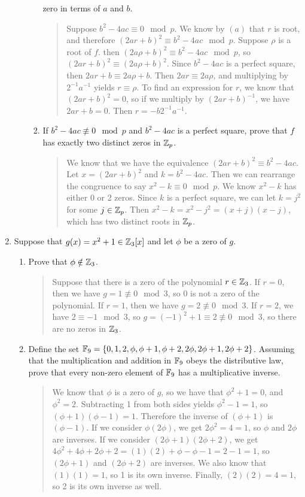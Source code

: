 \documentclass{hw}
\begin{document}
\begin{enumerate}
\begin{enumerate}
\begin{enumerate}
zero in terms of $a$ and $b$.
\begin{quote}
Suppose $b^{2}-4ac\equiv0\mod p$. We know by $(a)$ that $r$ is root, and therefore
$(2ar+b)^2\equiv b^2-4ac \mod p$. Suppose $\rho$ is a root of $f$. then
$(2a\rho+b)^2\equiv b^2-4ac \mod p$, so $(2ar+b)^2\equiv(2a\rho+b)^2$. Since $b^2-4ac$ is a perfect
square, then $2ar+b\equiv2a\rho+b$. Then $2ar\equiv2a\rho$, and multiplying by $2^{-1}a^{-1}$ yields
$r\equiv\rho$. To find an expression for $r$, we know that $(2ar+b)^2=0$, so if we multiply by
$(2ar+b)^{-1}$, we have $2ar+b=0$. Then $r=-b2^{-1}a^{-1}$.
\end{quote}
\item If $b^{2}-4ac\nequiv0\mod p$ and $b^{2}-4ac$ is a perfect square, prove that $f$ has exactly
two distinct zeros in $\mathbb{Z}_{p}$.
\begin{quote}
We know that we have the equivalence $(2ar+b)^2\equiv b^2-4ac$. Let $x=(2ar+b)^2$ and
$k=b^2-4ac$. Then we can rearrange the congruence to say $x^2-k\equiv0\mod p$. We know
$x^2-k$ has either 0 or 2 zeros. Since $k$ is a perfect square, we can let $k=j^2$ for some
$j\in\mathbb{Z}_{p}$. Then $x^2-k=x^2-j^2=(x+j)(x-j)$, which has two distinct roots in $\mathbb{Z}_{p}$.
\end{quote}
\end{enumerate}
\end{enumerate}

\item Suppose that $g(x)=x^2+1\in\mathbb{Z}_{3}[x]$ and let $\phi$ be a zero of $g$.
\begin{enumerate}
\item Prove that $\phi\notin\mathbb{Z}_{3}$.
\begin{quote}
Suppose that there is a zero of the polynomial $r\in\mathbb{Z}_{3}$. If $r=0$, then we have
$g=1\nequiv0\mod3$, so $0$ is not a zero of the polynomial. If $r=1$, then we have
$g=2\nequiv0\mod3$. If $r=2$, we have $2\equiv-1\mod3$, so $g=(-1)^2+1\equiv2\nequiv0\mod3$, so there
are no zeros in $\mathbb{Z}_{3}$.
\end{quote}
\item Define the set $\mathbb{F}_{9}=\{ 0,1,2,\phi,\phi+1,\phi+2,2\phi,2\phi+1,2\phi+2 \}$. Assuming that
the multiplication and addition in $\mathbb{F}_{9}$ obeys the distributive law, prove that every non-zero
element of $\mathbb{F}_{9}$ has a multiplicative inverse.
\begin{quote}
We know that $\phi$ is a zero of $g$, so we have that $\phi^2+1=0$, and $\phi^{2}=2$. Subtracting
1 from both sides yields $\phi^{2}-1=1$, so $(\phi+1)(\phi-1)=1$. Therefore the inverse of
$(\phi+1)$ is $(\phi-1)$. If we consider $\phi(2\phi)$, we get $2\phi^2=4=1$, so
$\phi$ and $2\phi$ are inverses. If we consider $(2\phi+1)(2\phi+2)$, we get
$4\phi^2+4\phi+2\phi+2=(1)(2)+\phi-\phi-1=2-1=1$, so $(2\phi+1)$ and $(2\phi+2)$ are inverses.
We also know that $(1)(1)=1$, so 1 is its own inverse. Finally, $(2)(2)=4=1$, so 2 is its own inverse
as well.
\end{quote}
\end{enumerate}


\end{enumerate}
\end{document}
